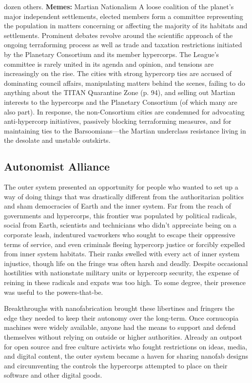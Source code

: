 dozen others.
\textbf{Memes:} Martian Nationalism
A loose coalition of the planet's major independent 
settlements, elected members form a committee representing the population in matters concerning or 
affecting the majority of its habitats and settlements. 
Prominent debates revolve around the scientific approach of the ongoing terraforming process as well 
as trade and taxation restrictions initiated by the 
Planetary Consortium and its member hypercorps. 
The League's committee is rarely united in its agenda 
and opinion, and tensions are increasingly on the rise. 
The cities with strong hypercorp ties are accused of 
dominating council affairs, manipulating matters 
behind the scenes, failing to do anything about the 
TITAN Quarantine Zone (p. 94), and selling out 
Martian interests to the hypercorps and the Planetary 
Consortium (of which many are also part). In response, the non-Consortium cities are condemned for 
advocating anti-hypercorp initiatives, passively blocking terraforming measures, and for maintaining ties to 
the Barsoomians—the Martian underclass resistance 
living in the desolate and unstable outskirts.

\subsection{Autonomist Alliance}

The outer system presented an opportunity for people 
who wanted to set up a way of doing things that was 
drastically different from the authoritarian politics 
and sham democracies of Earth and the inner system. 
Far from the reach of governments and hypercorps, 
this frontier was populated by political radicals, social 
from Earth, scientists and technicians who 
didn't appreciate being on a corporate 
leash, indentured vacworkers who sought 
to escape their oppressive terms of service, 
and even criminals fleeing hypercorp justice or forcibly expelled from inner system 
habitats. Their ranks swelled with every 
act of inner system injustice, though life 
on the fringe was often harsh and deadly. 
Despite occasional hostilities with nationstate military units or hypercorp security, 
the expense of reining in these radicals and 
expats was too high. To some degree, their 
presence was useful to the powers-that-be.

Breakthroughs with nanofabrication 
brought these libertines and fringers the 
edge they needed to keep their autonomy 
over the long-term. Once cornucopia 
machines were widely available, anyone 
had the means to support and defend 
themselves without relying on outside or 
higher authorities. Already an outpost for 
open source and free culture activists who 
fought restrictions on ideas, media, and 
digital content, the outer system became 
a haven for sharing nanofab designs and 
circumventing the controls the hypercorps 
attempted to place on their software and 
other digital goods.

